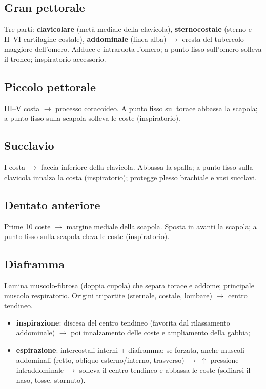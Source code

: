 \subsection{Gran pettorale}
Tre parti: \textbf{clavicolare} (metà mediale della clavicola), \textbf{sternocostale} (sterno e
II--VI cartilagine costale), \textbf{addominale} (linea alba) $\rightarrow$ cresta del tubercolo
maggiore dell'omero. Adduce e intraruota l'omero; a punto fisso sull'omero solleva il tronco;
inspiratorio accessorio.

\subsection{Piccolo pettorale}
III--V costa $\rightarrow$ processo coracoideo. A punto fisso sul torace abbassa la scapola; a punto
fisso sulla scapola solleva le coste (inspiratorio).

\subsection{Succlavio}
I costa $\rightarrow$ faccia inferiore della clavicola. Abbassa la spalla; a punto fisso sulla
clavicola innalza la costa (inspiratorio); protegge plesso brachiale e vasi succlavi.

\subsection{Dentato anteriore}
Prime 10 coste $\rightarrow$ margine mediale della scapola. Sposta in avanti la scapola; a punto
fisso sulla scapola eleva le coste (inspiratorio).

\subsection{Diaframma}
Lamina muscolo-fibrosa (doppia cupola) che separa torace e addome; principale muscolo respiratorio.
Origini tripartite (sternale, costale, lombare) $\rightarrow$ centro tendineo.
\begin{itemize}
  \item \textbf{inspirazione}: discesa del centro tendineo (favorita dal rilassamento addominale)
    $\rightarrow$ poi innalzamento delle coste e ampliamento della gabbia;
  \item \textbf{espirazione}: intercostali interni + diaframma; se forzata, anche muscoli addominali
    (retto, obliquo esterno/interno, trasverso) $\rightarrow$ $\uparrow$ pressione intraddominale
    $\rightarrow$ solleva il centro tendineo e abbassa le coste (soffiarsi il naso, tosse, starnuto).
\end{itemize}

